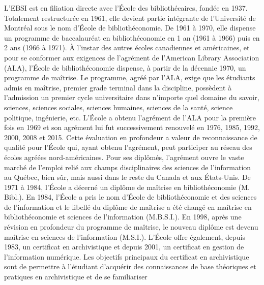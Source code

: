 \documentclass [12 pt]{article}
\begin{document}
            L'EBSI est en filiation directe avec l'École des bibliothécaires, fondée en 1937.
                Totalement restructurée en 1961, elle devient partie intégrante de l'Université de
                Montréal sous le nom d'École de bibliothéconomie. De 1961 à 1970, elle dispense un
                programme de baccalauréat en bibliothéconomie en 1 an (1961 à 1966) puis en 2 ans
                (1966 à 1971). À l'instar des autres écoles canadiennes et américaines, et pour se
                conformer aux exigences de l'agrément de l'American Library Association (ALA),
                l'École de bibliothéconomie dispense, à partir de la décennie 1970, un programme de
                maîtrise. Le programme, agréé par l'ALA, exige que les étudiants admis en maîtrise,
                premier grade terminal dans la discipline, possèdent à l'admission un premier cycle
                universitaire dans n'importe quel domaine du savoir, sciences, sciences sociales,
                sciences humaines, sciences de la santé, science politique, ingénierie, etc.
            L'École a obtenu l'agrément de l'ALA pour la première fois en 1969 et son agrément
                lui fut successivement renouvelé en 1976, 1985, 1992, 2000, 2008 et 2015. Cette
                évaluation en profondeur a valeur de reconnaissance de qualité pour l'École qui,
                ayant obtenu l'agrément, peut participer au réseau des écoles agréées
                nord-américaines. Pour ses diplômés, l'agrément ouvre le vaste marché de l'emploi
                relié aux champs disciplinaires des sciences de l'information au Québec, bien sûr,
                mais aussi dans le reste du Canada et aux États-Unis.
            De 1971 à 1984, l'École a décerné un diplôme de maîtrise en bibliothéconomie (M.
                Bibl.). En 1984, l'École a pris le nom d'École de bibliothéconomie et des sciences
                de l'information et le libellé du diplôme de maîtrise a été changé en maîtrise en
                bibliothéconomie et sciences de l'information (M.B.S.I.). En 1998, après une
                révision en profondeur du programme de maîtrise, le nouveau diplôme est devenu
                maîtrise en sciences de l'information (M.S.I.).
            L'École offre également, depuis 1983, un certificat en archivistique et depuis 2001,
                un certificat en gestion de l'information numérique. Les objectifs principaux du
                certificat en archivistique sont de permettre à l'étudiant d'acquérir des
                connaissances de base théoriques et pratiques en archivistique et de se familiariser
\end{document}
